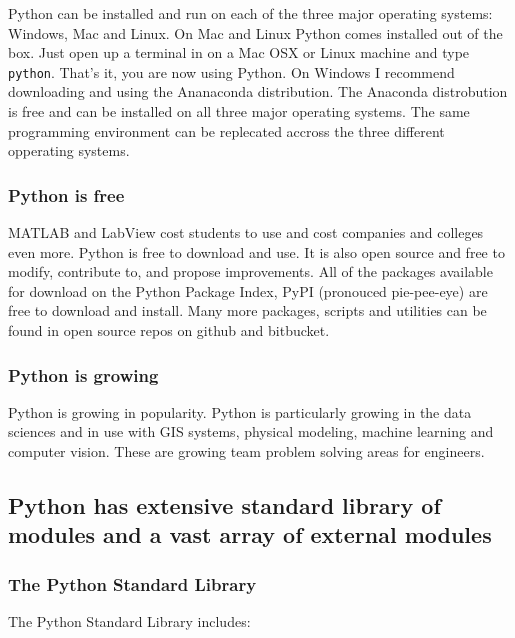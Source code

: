 \documentclass{book}
\begin{document}
Python can be installed and run on each of the three major operating
systems: Windows, Mac and Linux. On Mac and Linux Python comes installed
out of the box. Just open up a terminal in on a Mac OSX or Linux machine
and type \texttt{python}. That's it, you are now using Python. On
Windows I recommend downloading and using the Ananaconda distribution.
The Anaconda distrobution is free and can be installed on all three
major operating systems. The same programming environment can be
replecated accross the three different opperating systems.

\subsubsection{Python is free}\label{python-is-free}

MATLAB and LabView cost students to use and cost companies and colleges
even more. Python is free to download and use. It is also open source
and free to modify, contribute to, and propose improvements. All of the
packages available for download on the Python Package Index, PyPI
(pronouced pie-pee-eye) are free to download and install. Many more
packages, scripts and utilities can be found in open source repos on
github and bitbucket.

\subsubsection{Python is growing}\label{python-is-growing}

Python is growing in popularity. Python is particularly growing in the
data sciences and in use with GIS systems, physical modeling, machine
learning and computer vision. These are growing team problem solving
areas for engineers.

    \subsection{Python has extensive standard library of modules and a vast
array of external
modules}\label{python-has-extensive-standard-library-of-modules-and-a-vast-array-of-external-modules}

    \subsubsection{The Python Standard
Library}\label{the-python-standard-library}

The Python Standard Library includes:
\end{document}

